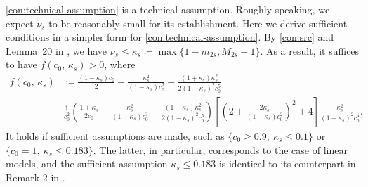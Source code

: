 \ref{con:technical-assumption} is a technical assumption. Roughly speaking, we expect $\nu_s$ to be reasonably small for its establishment. Here we derive sufficient conditions in a simpler form for \ref{con:technical-assumption}.
By \ref{con:src} and Lemma~20 in \citet{huang2017constructive}, we have $\nu_s \leq \kappa_s \coloneqq \max \{1-m_{2s}, M_{2s}-1\}$. As a result, it suffices to have $f(c_0,\,\kappa_s) > 0$, where
\begin{align*}
f(c_0,\,\kappa_s)
&\coloneqq \frac{(1-\kappa_s)c_0}{2}-\frac{\kappa_s^2}{(1-\kappa_s)c_0^3}-\frac{(1+\kappa_s)\kappa_s^2}{2(1-\kappa_s)^2c_{0}^5} \\
\quad-& \frac{1}{c_0^2}\left(\frac{1+\kappa_s}{2c_0}+\frac{\kappa_s^2}{(1-\kappa_s)c_0^3}+ \frac{(1+\kappa_s)\kappa_s^2}{2(1-\kappa_s)^2c_0^5}\right)\left[\left(2+\frac{2\kappa_s}{(1-\kappa_s)c_0^2}\right)^2+4\right]\frac{\kappa_s^2}{(1-\kappa_s)^2c_0^4}.
\end{align*}
It holds if sufficient assumptions are made, such as $\{c_0\geq 0.9,\ \kappa_s\leq 0.1\}$ or $\{c_0 = 1,\ \kappa_s\leq 0.183\}$. The latter, in particular, corresponds to the case of linear models, and the sufficient assumption $\kappa_s\leq 0.183$ is identical to its counterpart in Remark 2 in \citet{zhu2020polynomial}.

